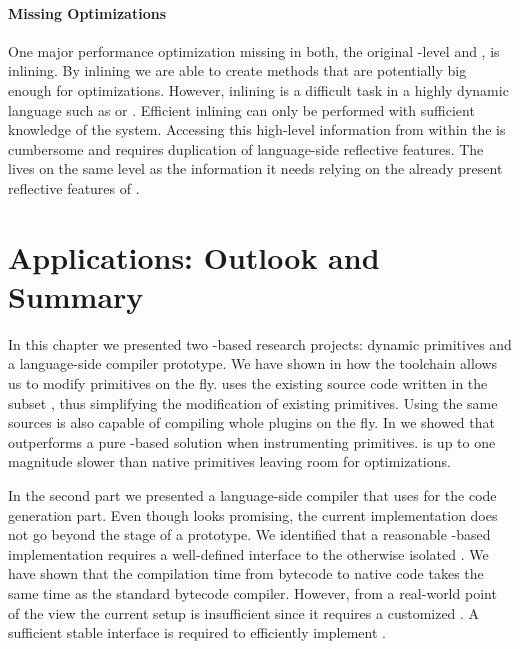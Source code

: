 \paragraph{Missing Optimizations}
One major performance optimization missing in both, the original \PH \VM-level \JIT and \NBJ, is inlining. 
By inlining we are able to create methods that are potentially big enough for optimizations.
However, inlining is a difficult task in a highly dynamic language such as \ST or \Self \cite{Cham89a}. 
Efficient inlining can only be performed with sufficient knowledge of the system. 
Accessing this high-level information from within the \VM is cumbersome and requires duplication of language-side reflective features.
The \JIT lives on the same level as the information it needs relying on the already present reflective features of \ST.


\newpage
\section{\B Applications: Outlook and Summary}


In this chapter we presented two \B-based research projects: dynamic primitives and a language-side \JIT compiler prototype.
We have shown in  how the \WF toolchain allows us to modify \PH primitives on the fly. 
\WF uses the existing \VM source code written in the \ST subset \Slang, thus simplifying the modification of existing primitives.
Using the same \Slang sources \WF is also capable of compiling whole plugins on the fly.
In  we showed that \WF outperforms a pure \PH-based solution when instrumenting primitives.
\WF is up to one magnitude slower than native \VM primitives leaving room for optimizations.

In the second part we presented \NBJ a language-side \JIT compiler that uses \B for the code generation part.
Even though \NBJ looks promising, the current implementation does not go beyond the stage of a prototype.
We identified that a reasonable \B-based \JIT implementation requires a well-defined interface to the otherwise isolated \JIT.
We have shown that the compilation time from bytecode to native code takes the same time as the standard bytecode compiler.
However, from a real-world point of the view the current \NBJ setup is insufficient since it requires a customized \VM.
A sufficient stable \JIT interface is required to efficiently implement \NBJ.

